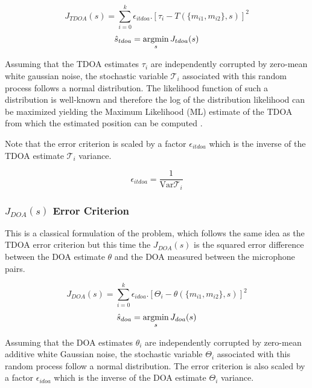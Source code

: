 \begin{equation}
J_{TDOA}(s) = {\sum}_{i=0}^k \epsilon_{itdoa}.[\tau_{i}-T(\{m_{i1},m_{i2}\},s)]^2
\label{eq:jtdoa}
\end{equation}
\begin{equation}
\hat{s}_{tdoa}= \argmin_{s} J_{tdoa}(s) 
\end{equation}

Assuming that the TDOA estimates $\tau_{i}$ are independently corrupted by zero-mean white gaussian noise, the stochastic variable $\mathcal{T}_{i}$ associated with this random process follows a normal distribution. The likelihood function of such a distribution is well-known and therefore the log of the distribution likelihood can be maximized yielding the Maximum Likelihood (ML) estimate of the TDOA from which the estimated position can be computed . 

Note that the error criterion is scaled by a factor $\epsilon_{itdoa}$ which is the inverse of the TDOA estimate $\mathcal{T}_{i}$ variance. 

\begin{equation}
\epsilon_{itdoa}=\frac{1}{\mathrm{Var}{\mathcal{T}_{i}}}
\label{eq:epsilonjtdoa}
\end{equation}

\subsubsection{$J_{DOA}(s)$ Error Criterion}

This is a classical formulation of the problem, which follows the same idea as the TDOA error criterion but this time the $J_{DOA}(s)$ is the squared error difference between the DOA estimate $\theta$ and the DOA measured between the microphone pairs. 

\begin{equation}
J_{DOA}(s) = {\sum}_{i=0}^k \epsilon_{idoa}.[\Theta_{i}-\theta(\{m_{i1},m_{i2}\},s)]^2
\label{eq:jdoa}
\end{equation}
\begin{equation}
\hat{s}_{doa}= \argmin_{s} J_{doa}(s) 
\end{equation}


Assuming that the DOA estimates $\theta_{i}$ are independently corrupted by zero-mean additive white Gaussian noise, the stochastic variable $\Theta_{i}$ associated with this random process follow a normal distribution. The error criterion is also scaled by a factor $\epsilon_{idoa}$ which is the inverse of the DOA estimate $\Theta_{i}$ variance. 

